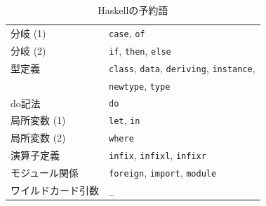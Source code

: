 \documentclass[a5paper,twoside,fleqn,draft]{jsbook}
\newcommand{\programminglanguage}[1]{\textsf{#1}}
\newcommand{\haskell}{\programminglanguage{Haskell}}
\newcommand{\code}[1]{\texttt{#1}}
\begin{document}

\begin{table}
\caption{\haskell の予約語}
\label{tab:reserved-keywords}
\begin{center}
\begin{tabular}{||l|l||}
\hline
分岐 (1)&\code{case}, \code{of}\\
分岐 (2)&\code{if}, \code{then}, \code{else}\\
型定義&\code{class}, \code{data}, \code{deriving}, \code{instance},\\
&\code{newtype}, \code{type}\\
do記法&\code{do}\\
局所変数 (1)&\code{let}, \code{in}\\
局所変数 (2)&\code{where}\\
演算子定義&\code{infix}, \code{infixl}, \code{infixr}\\
モジュール関係&\code{foreign}, \code{import}, \code{module}\\
ワイルドカード引数&\code{\_}\\
\hline
\end{tabular}
\end{center}
\end{table}

\end{document}
